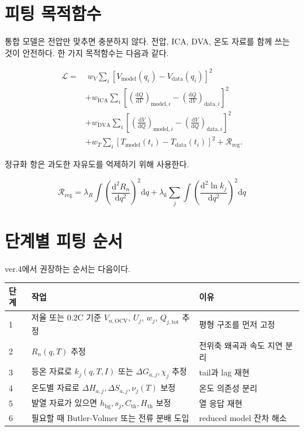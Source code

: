 \documentclass[11pt,a4paper]{article}
\newcommand{\dd}{\mathrm{d}}
\newcommand{\OCV}{\mathrm{OCV}}
\newcommand{\tot}{\mathrm{tot}}
\begin{document}
\section{피팅 목적함수}
통합 모델은 전압만 맞추면 충분하지 않다. 전압, ICA, DVA, 온도 자료를 함께 쓰는 것이 안전하다. 한 가지 목적함수는 다음과 같다.

\begin{align}
\mathcal L
=&\;w_V\sum_i\left[V_{\mathrm{model}}(q_i)-V_{\mathrm{data}}(q_i)\right]^2 \\
&+w_{\mathrm{ICA}}\sum_i\left[\left(\frac{\dd Q}{\dd V}\right)_{\mathrm{model},i}-\left(\frac{\dd Q}{\dd V}\right)_{\mathrm{data},i}\right]^2 \\
&+w_{\mathrm{DVA}}\sum_i\left[\left(\frac{\dd V}{\dd Q}\right)_{\mathrm{model},i}-\left(\frac{\dd V}{\dd Q}\right)_{\mathrm{data},i}\right]^2 \\
&+w_T\sum_i\left[T_{\mathrm{model}}(t_i)-T_{\mathrm{data}}(t_i)\right]^2+\mathcal R_{\mathrm{reg}} .
\label{eq:v4_loss}
\end{align}

정규화 항은 과도한 자유도를 억제하기 위해 사용한다.

\begin{equation}
\mathcal R_{\mathrm{reg}}=\lambda_R\int\left(\frac{\dd^2R_n}{\dd q^2}\right)^2\dd q+\lambda_k\sum_j\int\left(\frac{\dd^2\ln k_j}{\dd q^2}\right)^2\dd q
\label{eq:v4_reg}
\end{equation}

\section{단계별 피팅 순서}
ver.4에서 권장하는 순서는 다음이다.

\begin{longtable}{p{}p{}p{}}
\toprule
단계 & 작업 & 이유 \\
\midrule
\endhead
1 & 저율 또는 0.2C 기준 \(V_{n,\OCV}\), \(U_j\), \(w_j\), \(Q_{j,\tot}\) 추정 & 평형 구조를 먼저 고정 \\
2 & \(R_n(q,T)\) 추정 & 전위축 왜곡과 속도 지연 분리 \\
3 & 등온 자료로 \(k_j(q,T,I)\) 또는 \(\Delta G_{a,j},\chi_j\) 추정 & tail과 lag 재현 \\
4 & 온도별 자료로 \(\Delta H_{a,j},\Delta S_{a,j},\nu_j(T)\) 보정 & 온도 의존성 분리 \\
5 & 발열 자료가 있으면 \(h_{\mathrm{bg}},s_j,C_{\mathrm{th}},H_{\mathrm{th}}\) 보정 & 열 응답 재현 \\
6 & 필요할 때 Butler-Volmer 또는 전류 분배 도입 & reduced model 잔차 해소 \\
\bottomrule
\end{longtable}
\end{document}

